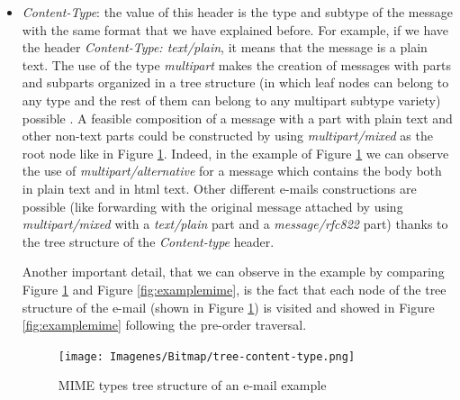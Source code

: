 \begin{itemize}
	\item\textit{Content-Type}: the value of this header is the type and subtype of the message with the same format that we have explained before. For example, if we have the header \textit{Content-Type: text/plain}, it means that the message is a plain text. The use of the type \textit{multipart} makes the creation of messages with parts and subparts organized in a tree structure (in which leaf nodes can belong to any type and the rest of them can belong to any multipart subtype variety) possible \citep[Section 7.2]{rfc1341}. A feasible composition of a message with a part with plain text and other non-text parts could be constructed by using \textit{multipart/mixed} as the root node like in Figure \ref{fig:content-type}. Indeed, in the example of Figure \ref{fig:content-type} we can observe the use of \textit{multipart/alternative} for a message which contains the body both in plain text and in html text. Other different e-mails constructions are possible (like forwarding with the original message attached by using \textit{multipart/mixed} with a \textit{text/plain} part and a \textit{message/rfc822} part) thanks to the tree structure of the \textit{Content-type} header.
	
	Another important detail, that we can observe in the example by comparing Figure \ref{fig:content-type} and Figure \ref{fig:examplemime}, is the fact that each node of the tree structure of the e-mail (shown in Figure \ref{fig:content-type}) is visited and showed in Figure \ref{fig:examplemime} following the pre-order traversal.
	
	\begin{figure}[t]
		\centering%
		\centerline{\texttt{[image: Imagenes/Bitmap/tree-content-type.png]}}%
		\caption{MIME types tree structure of an e-mail example}%
		\label{fig:content-type}
	\end{figure}


\end{itemize}
